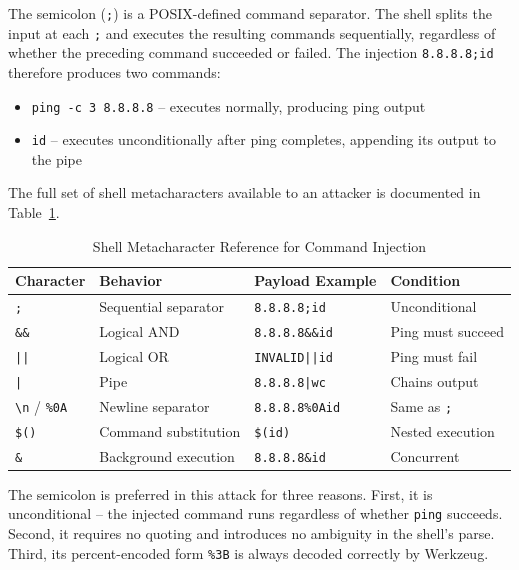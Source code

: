 The semicolon (\texttt{;}) is a POSIX-defined command separator. The shell splits the input at each \texttt{;} and executes the resulting commands sequentially, regardless of whether the preceding command succeeded or failed. The injection \texttt{8.8.8.8;id} therefore produces two commands:

\begin{itemize}
    \item \texttt{ping -c 3 8.8.8.8} -- executes normally, producing ping output
    \item \texttt{id} -- executes unconditionally after ping completes, appending its output to the pipe
\end{itemize}

The full set of shell metacharacters available to an attacker is documented in Table~\ref{tab:metacharacters}.

\begin{table}[h]
\centering
\caption{Shell Metacharacter Reference for Command Injection}
\label{tab:metacharacters}
\begin{tabular}{|l|l|l|l|}
\hline
\textbf{Character} & \textbf{Behavior} & \textbf{Payload Example} & \textbf{Condition} \\
\hline
\texttt{;} & Sequential separator & \texttt{8.8.8.8;id} & Unconditional \\
\texttt{\&\&} & Logical AND & \texttt{8.8.8.8\&\&id} & Ping must succeed \\
\texttt{||} & Logical OR & \texttt{INVALID||id} & Ping must fail \\
\texttt{|} & Pipe & \texttt{8.8.8.8|wc} & Chains output \\
\texttt{\textbackslash n} / \texttt{\%0A} & Newline separator & \texttt{8.8.8.8\%0Aid} & Same as \texttt{;} \\
\texttt{\$()} & Command substitution & \texttt{\$(id)} & Nested execution \\
\texttt{\&} & Background execution & \texttt{8.8.8.8\&id} & Concurrent \\
\hline
\end{tabular}
\end{table}

The semicolon is preferred in this attack for three reasons. First, it is unconditional -- the injected command runs regardless of whether \texttt{ping} succeeds. Second, it requires no quoting and introduces no ambiguity in the shell's parse. Third, its percent-encoded form \texttt{\%3B} is always decoded correctly by Werkzeug.

